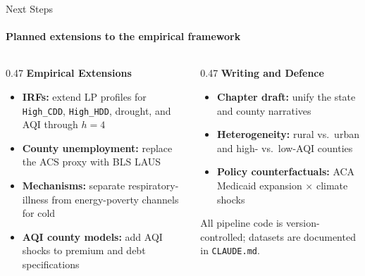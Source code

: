 \documentclass[aspectratio=169,11pt]{beamer}
\newcommand{\emphcolor}[1]{{\color{WarmOrange}\textbf{#1}}}
\newcommand{\tealtext}[1]{{\color{Teal}#1}}
\begin{document}
\begin{frame}{Next Steps}
  \framesubtitle{Planned extensions to the empirical framework}
  \begin{columns}[T]
    \begin{column}{0.47\textwidth}
      \textbf{\tealtext{Empirical Extensions}}\\[-0.1em]
      \footnotesize
      \begin{itemize}\itemsep0.18em
        \item \emphcolor{IRFs:} extend LP profiles for \texttt{High\_CDD}, \texttt{High\_HDD}, drought, and AQI through $h = 4$
        \item \emphcolor{County unemployment:} replace the ACS proxy with BLS LAUS
        \item \emphcolor{Mechanisms:} separate respiratory-illness from energy-poverty channels for cold
        \item \emphcolor{AQI county models:} add AQI shocks to premium and debt specifications
      \end{itemize}
    \end{column}
    \begin{column}{0.47\textwidth}
      \textbf{\tealtext{Writing and Defence}}\\[-0.1em]
      \footnotesize
      \begin{itemize}\itemsep0.18em
        \item \emphcolor{Chapter draft:} unify the state and county narratives
        \item \emphcolor{Heterogeneity:} rural vs.\ urban and high- vs.\ low-AQI counties
        \item \emphcolor{Policy counterfactuals:} ACA Medicaid expansion $\times$ climate shocks
      \end{itemize}
      \vspace{0.3em}
      \tealtext{\scriptsize All pipeline code is version-controlled; datasets are documented in \texttt{CLAUDE.md}.}
    \end{column}
  \end{columns}
\end{frame}
\end{document}
